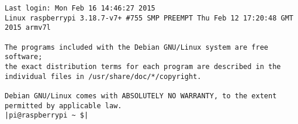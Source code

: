 \begin{lstlisting}
Last login: Mon Feb 16 14:46:27 2015
Linux raspberrypi 3.18.7-v7+ #755 SMP PREEMPT Thu Feb 12 17:20:48 GMT 2015 armv7l

The programs included with the Debian GNU/Linux system are free software;
the exact distribution terms for each program are described in the
individual files in /usr/share/doc/*/copyright.

Debian GNU/Linux comes with ABSOLUTELY NO WARRANTY, to the extent
permitted by applicable law.
|pi@raspberrypi ~ $|
\end{lstlisting}
